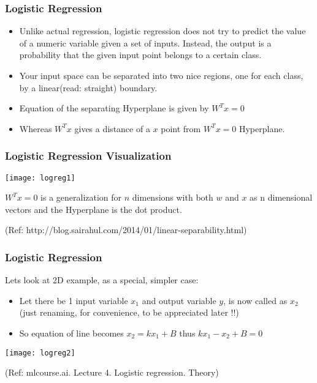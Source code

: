 \begin{frame}[fragile]\frametitle{Logistic Regression}
\begin{itemize}
\item Unlike actual regression, logistic regression does not try to predict the value of a numeric variable given a set of inputs. Instead, the output is a probability that the given input point belongs to a certain class.
\item  Your input space can be separated into two nice regions, one for each class, by a linear(read: straight) boundary.

\item Equation of the separating Hyperplane is given by $W^Tx = 0$ 

\item Whereas $W^Tx$ gives a distance of a $x$ point from $W^Tx = 0$ Hyperplane.
\end{itemize}

\end{frame}

\begin{frame}[fragile]\frametitle{Logistic Regression Visualization}
\begin{center}
\texttt{[image: logreg1]}
\end{center}

$W^Tx = 0$ is a generalization for $n$ dimensions with both $w$ and $x$ as n dimensional vectors and the Hyperplane is the dot product.

{\tiny (Ref: http://blog.sairahul.com/2014/01/linear-separability.html)}
\end{frame}


\begin{frame}[fragile]\frametitle{Logistic Regression}
Lets look at 2D example, as a special, simpler case:
\begin{itemize}
\item Let there be 1 input variable $x_1$ and output variable $y$, is now called as $x_2$ (just renaming, for convenience, to be appreciated later !!)

\item So equation of line becomes $x_2 = kx_1 + B$ thus $kx_1 -x_2 + B =0$
\end{itemize}

\begin{center}
\texttt{[image: logreg2]}
\end{center}

{\tiny (Ref: mlcourse.ai. Lecture 4. Logistic regression. Theory)}

\end{frame}


